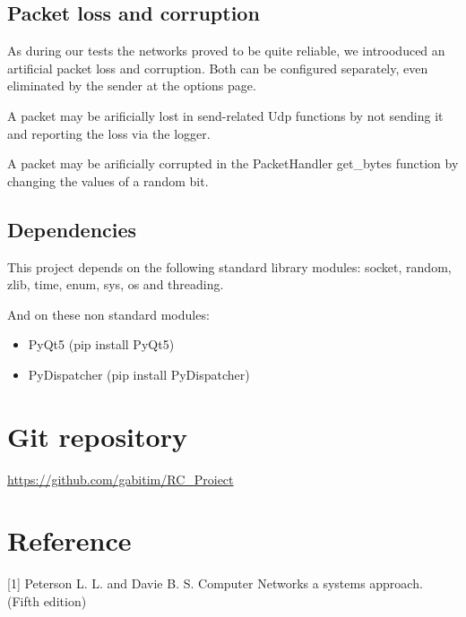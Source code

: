 \documentclass[12pt]{article}
\begin{document}
\subsection{Packet loss and corruption}

As during our tests the networks proved to be quite reliable, we introoduced an artificial packet loss and corruption. Both can be configured separately, even eliminated by the sender at the options page.

A packet may be arificially lost in send-related Udp functions by not sending it and reporting the loss via the logger.

A packet may be arificially corrupted in the PacketHandler get\_bytes function by changing the values of a random bit.

\subsection{Dependencies}

This project depends on the following standard library modules: socket, random, zlib, time, enum, sys, os and threading.

And on these non standard modules:

\begin{itemize}
	\item PyQt5 (pip install PyQt5)
	\item PyDispatcher (pip install PyDispatcher)
\end{itemize}

\section{Git repository}

\url{https://github.com/gabitim/RC_Proiect}

\section{Reference}

\small

[1] Peterson L. L. and Davie B. S. Computer Networks a systems approach. (Fifth edition)
\end{document}
